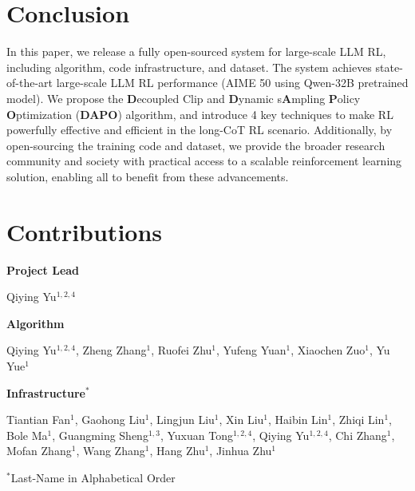 \section{Conclusion}

In this paper, we release a fully open-sourced system for large-scale LLM RL, including algorithm, code infrastructure, and dataset. The system achieves state-of-the-art large-scale LLM RL performance (AIME 50 using Qwen-32B pretrained model). We propose the \textbf{D}ecoupled Clip and \textbf{D}ynamic s\textbf{A}mpling \textbf{P}olicy \textbf{O}ptimization (\textbf{DAPO}) algorithm, and introduce 4 key techniques to make RL powerfully effective and efficient in the long-CoT RL scenario.
Additionally, by open-sourcing the training code and dataset, we provide the broader research community and society with practical access to a scalable reinforcement learning solution, enabling all to benefit from these advancements. 

\newpage

\section*{Contributions}

\textbf{Project Lead}\quad 

Qiying Yu$^{1,2,4}$


\textbf{Algorithm}

Qiying Yu$^{1,2,4}$, Zheng Zhang$^{1}$, Ruofei Zhu$^{1}$, Yufeng Yuan$^{1}$, Xiaochen Zuo$^{1}$, Yu Yue$^{1}$


\textbf{Infrastructure$^{*}$}

Tiantian Fan$^{1}$, Gaohong Liu$^{1}$, Lingjun Liu$^{1}$, Xin Liu$^{1}$, Haibin Lin$^{1}$, Zhiqi Lin$^{1}$, Bole Ma$^{1}$, Guangming Sheng$^{1,3}$, Yuxuan Tong$^{1,2,4}$, Qiying Yu$^{1,2,4}$, Chi Zhang$^{1}$, Mofan Zhang$^{1}$, Wang Zhang$^{1}$, Hang Zhu$^{1}$, Jinhua Zhu$^{1}$

$^{*}$Last-Name in Alphabetical Order


